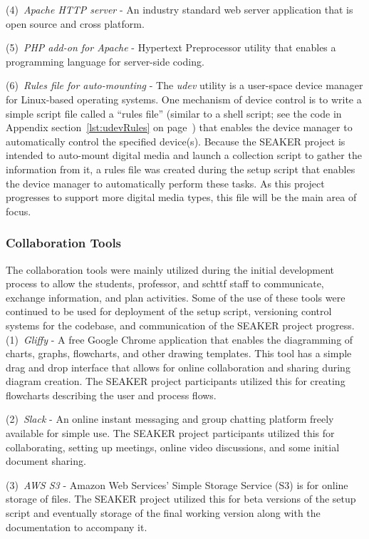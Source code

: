 \documentclass[12pt]{article}
\begin{document}
(4)~{\em Apache HTTP server} - An industry standard web
server application that is open source and cross platform.

(5)~{\em PHP add-on for Apache} - Hypertext Preprocessor utility
that enables a programming language for server-side coding.

(6)~{\em Rules file for auto-mounting} - The {\em udev} utility 
is a user-space device manager for Linux-based operating systems. 
One mechanism of device control is to write a simple script file
called a ``rules file''
(similar to a shell script; see the code in Appendix section~\ref{lst:udevRules}
on page~\pageref{lst:udevRules}) that enables the device manager
to automatically control the specified device(s).  Because 
the SEAKER project is intended to auto-mount digital media and
launch a collection script to gather the information
from it, a rules file was created during the setup script
that enables the device manager to automatically perform
these tasks.  As this project progresses to support more
digital media types, this file will be the main area of focus.

\subsubsection{Collaboration Tools}

The collaboration tools were mainly utilized during the initial
development process to allow the students, professor, and \gls{schttf}
staff to communicate, exchange information, and plan activities.  Some
of the use of these tools were continued to be used for deployment of
the setup script, versioning control systems for the codebase, and
communication of the SEAKER project progress.\\

(1)~{\em Gliffy} - A free Google Chrome application that enables the diagramming
of charts, graphs, flowcharts, and other drawing templates.  This tool
has a simple drag and drop interface that allows for online collaboration 
and sharing during diagram creation.  The SEAKER project participants
utilized this for creating flowcharts describing the user and process
flows.

(2)~{\em Slack} - An online instant messaging and group chatting platform
freely available for simple use.  The SEAKER project participants utilized
this for collaborating, setting up meetings, online video discussions, and
some initial document sharing.

(3)~{\em AWS S3} - Amazon Web Services' Simple Storage Service (S3) is for online
storage of files.  The SEAKER project utilized this for beta versions of
the setup script and eventually storage of the final working version along
with the documentation to accompany it.
\end{document}
